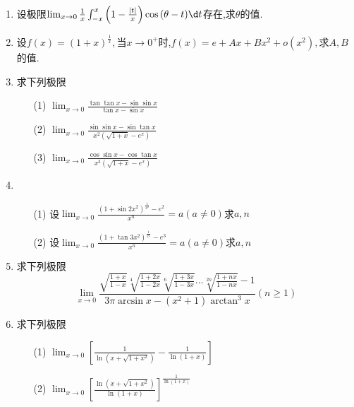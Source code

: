 \documentclass[12pt, a4paper, oneside, UTF8]{ctexbook}
\begin{document}
\begin{enumerate}
    \newpage
    
    \item 设极限$\lim_{x\to 0}\frac{1}{x}\int_{-x}^{x}\left(1-\frac{\left|t\right|}{x}\right)\cos{(\theta - t)}\d t$存在,求$\theta$的值.
    
    \newpage
    
    \item 设$f(x)=(1+x)^{\frac{1}{x}},$当$x\to 0^+$时,$f(x)=e+Ax+Bx^2+o(x^2),$求$A,B$的值.
    
    \newpage
    
    \item 求下列极限
    \begin{enumerate}
        \item [(1)] $\lim_{x\to 0}\frac{\tan{\tan{x}}-\sin{\sin{x}}}{\tan{x}-\sin{x}}$
        \item [(2)] $\lim_{x\to 0}\frac{\sin\sin{x}-\sin\tan{x}}{x^2(\sqrt{1+x}-e^x)}$
        \item [(3)] $\lim_{x\to 0}\frac{\cos\sin{x} - \cos\tan{x}}{x^3(\sqrt{1+x}-e^x)}$
    \end{enumerate}
    
    \newpage
        
    \item 
    \begin{enumerate}
        \item [(1)] 设$\lim_{x\to 0}\frac{(1+\sin{2x^2})^{\frac{1}{x^2}}-e^2}{x^n}=a(a\neq 0)$求$a,n$
        \item [(2)] 设$\lim_{x\to 0}\frac{(1+\tan{3x^2})^{\frac{1}{x^2}}-e^3}{x^n}=a(a\neq 0)$求$a,n$
    \end{enumerate}
    
    \newpage
    
    \item 求下列极限
    $$
    \lim_{x\to 0}\frac{\sqrt{\frac{1+x}{1-x}}\sqrt[4]{\frac{1+2x}{1-2x}}\sqrt[6]{\frac{1+3x}{1-3x}}\ldots\sqrt[2n]{\frac{1+nx}{1-nx}}-1}{3\pi\arcsin{x}-(x^2+1)\arctan^3{x}}(n\geq 1)
    $$
    
    \newpage
    
    \item 求下列极限
    \begin{enumerate}
        \item [(1)] $\lim_{x\to 0}\left[\frac{1}{\ln{(x+\sqrt{1+x^2})}}-\frac{1}{\ln{(1+x)}}\right]$
        \item [(2)] $\lim_{x\to 0}\left[\frac{\ln{(x+\sqrt{1+x^2})}}{\ln{(1+x)}}\right]^{\frac{1}{\ln{(1+x)}}}$
    \end{enumerate}
    

\end{enumerate}
\end{document}
